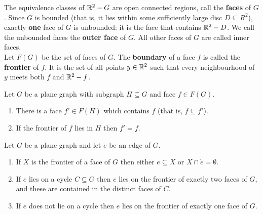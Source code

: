The equivalence classes of \(\mathbb{R}^2 - G\) are open connected regions, call the \textbf{faces} of \(G\). Since \(G\) is bounded (that is, it lies within some sufficiently large disc \(D \subseteq R^2\)), exactly \textbf{one} face of \(G\) is unbounded: it is the face that contains \(\mathbb{R}^2 - D\). We call the unbounded faces the \textbf{outer face} of \(G\). All other faces of \(G\) are called inner faces. \\

Let \(F(G)\) be the set of faces of \(G\). The \textbf{boundary} of a face \(f\) is called the \textbf{frontier} of \(f\). It is the set of all points \(y \in \mathbb{R}^2\) such that every neighbourhood of \(y\) meets both \(f\) and \(\mathbb{R}^2 - f\).

\begin{lemma} \label{lemma-6.1.1}
    Let \(G\) be a plane graph with subgraph \(H \subseteq G\) and face \(f \in F(G)\).
    \begin{enumerate}[label=(\roman*)]
        \item There is a face \(f' \in F(H)\) which contains \(f\) (that is, \(f \subseteq f'\)).
        \item If the frontier of \(f\) lies in \(H\) then \(f' = f\).
    \end{enumerate}
\end{lemma}

\begin{lemma} \label{lemma-6.1.2}
    Let \(G\) be a plane graph and let \(e\) be an edge of \(G\).
    \begin{enumerate}[label=(\roman*)]
        \item If \(X\) is the frontier of a face of \(G\) then either \(e \subseteq X\) or \(X \cap \mathring{e} = \emptyset\).
        \item If \(e\) lies on a cycle \(C \subseteq G\) then \(e\) lies on the frontier of exactly two faces of \(G\), and these are contained in the distinct faces of \(C\).
        \item If \(e\) does not lie on a cycle then \(e\) lies on the frontier of exactly one face of \(G\).
    \end{enumerate}
\end{lemma}


